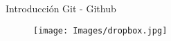 \begin{frame}[t]{Introducción Git - Github}\vspace{10pt}
\begin{figure}	\texttt{[image: Images/dropbox.jpg]}
\end{figure}
\end{frame}